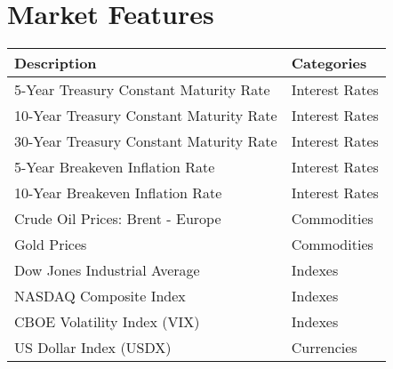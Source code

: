 \chapter{Market Features}
\label{appendix:features_list}
\par
\begin{longtable}{|| m{10cm}| m{3.5cm}||}
\hline
Description & Categories \\ \hline \hline
5-Year Treasury Constant Maturity Rate & Interest Rates\\ \hline
10-Year Treasury Constant Maturity Rate & Interest Rates\\ \hline
30-Year Treasury Constant Maturity Rate & Interest Rates\\ \hline
5-Year Breakeven Inflation Rate & Interest Rates\\ \hline
10-Year Breakeven Inflation Rate & Interest Rates\\ \hline
Crude Oil Prices: Brent - Europe &  Commodities\\ \hline
Gold Prices &  Commodities\\ \hline
Dow Jones Industrial Average &  Indexes\\ \hline
NASDAQ Composite Index &  Indexes\\ \hline
CBOE Volatility Index (VIX) &  Indexes\\ \hline
US Dollar Index (USDX) &  Currencies\\ \hline
\end{longtable}